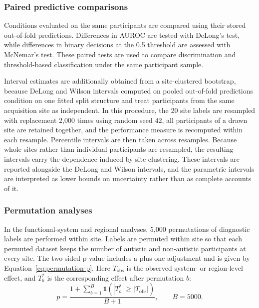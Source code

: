 \subsubsection{Paired predictive comparisons}
\label{subsubsec:paired-comparisons}

Conditions evaluated on the same participants are compared using their stored out-of-fold predictions. Differences in AUROC are tested with DeLong's test, while differences in binary decisions at the 0.5 threshold are assessed with McNemar's test. These paired tests are used to compare discrimination and threshold-based classification under the same participant sample.

Interval estimates are additionally obtained from a site-clustered bootstrap, because DeLong
and Wilson intervals computed on pooled out-of-fold predictions condition on one fitted split
structure and treat participants from the same acquisition site as independent. In this
procedure, the 20 site labels are resampled with replacement 2,000 times using random seed 42,
all participants of a drawn site are retained together, and the performance measure is
recomputed within each resample. Percentile intervals are then taken across resamples. Because
whole sites rather than individual participants are resampled, the resulting intervals carry
the dependence induced by site clustering. These intervals are reported alongside the DeLong
and Wilson intervals, and the parametric intervals are interpreted as lower bounds on
uncertainty rather than as complete accounts of it.


\subsubsection{Permutation analyses}
\label{subsubsec:permutation-analyses}

In the functional-system and regional analyses, 5,000 permutations of diagnostic labels are
performed within site. Labels are permuted within site so that each permuted dataset keeps
the number of autistic and non-autistic participants at every site. The two-sided p-value
includes a plus-one adjustment and is given by Equation~\eqref{eq:permutation-p}. Here
$T_{\mathrm{obs}}$ is the observed system- or region-level effect, and $T_b^\ast$ is the
corresponding effect after permutation $b$:
\begin{equation}
p
=
\frac{
1
+
\sum_{b=1}^{B}
\mathbb{1}\left(
\left|T_b^\ast\right|
\geq
\left|T_{\mathrm{obs}}\right|
\right)
}{
B+1
},
\qquad B=5000.
\label{eq:permutation-p}
\end{equation}

